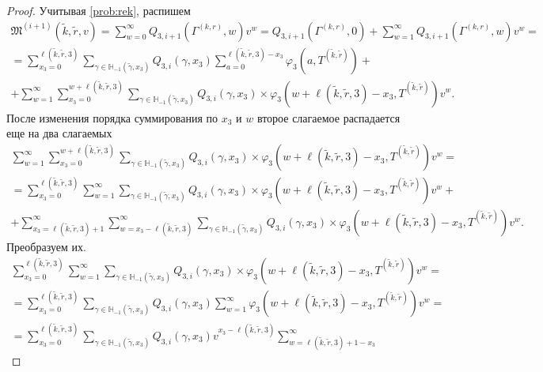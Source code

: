 \documentclass[a4paper,12pt,russian]{extarticle}
\begin{document}
\begin{proof}
Учитывая \eqref{prob:rek}, распишем
\begin{multline}
\mathfrak{M}^{(i+1)}(\tilde{k},\tilde{r},v) =\sum_{w=0}^{\infty} Q_{3,i+1}(\Gamma^{(k,r)},w) v^w = Q_{3,i+1}(\Gamma^{(k,r)},0) + \sum_{w=1}^{\infty} Q_{3,i+1}(\Gamma^{(k,r)},w) v^w =\\
=\sum_{x_3=0}^{\ell(\tilde{k},\tilde{r},3)}\sum_{\gamma \in {\mathbb H}_{-1}(\tilde{\gamma},x_3)} Q_{3,i}(\gamma,x_3) \sum_{a=0}^{\ell(\tilde{k},\tilde{r},3) - x_3} \varphi_3(a,T^{(\tilde{k},\tilde{r})}) + \\
+ \sum_{w=1}^{\infty} \sum_{x_3=0}^{w +  \ell(\tilde{k},\tilde{r},3)}\sum_{\gamma \in {\mathbb H}_{-1}(\tilde{\gamma},x_3)} Q_{3,i}(\gamma,x_3) \times 
\varphi_3(w + \ell(\tilde{k},\tilde{r},3) - x_3,T^{(\tilde{k},\tilde{r})}) v^w.
\label{sum:zero}
\end{multline}
После изменения порядка суммирования по $x_3$ и $w$ второе слагаемое распадается еще на два слагаемых
\begin{multline}
\sum_{w=1}^{\infty} \sum_{x_3=0}^{w +  \ell(\tilde{k},\tilde{r},3)}\sum_{\gamma \in {\mathbb H}_{-1}(\tilde{\gamma},x_3)} Q_{3,i}(\gamma,x_3) \times 
\varphi_3(w + \ell(\tilde{k},\tilde{r},3) - x_3,T^{(\tilde{k},\tilde{r})}) v^w = \\
= \sum_{x_3=0}^{\ell(\tilde{k},\tilde{r},3)}\sum_{w=1}^{\infty}\sum_{\gamma \in {\mathbb H}_{-1}(\tilde{\gamma},x_3)} Q_{3,i}(\gamma,x_3) \times 
\varphi_3(w + \ell(\tilde{k},\tilde{r},3) - x_3,T^{(\tilde{k},\tilde{r})}) v^w + \\
+\sum_{x_3=\ell(\tilde{k},\tilde{r},3) + 1}^{\infty}\sum_{w=x_3-\ell(\tilde{k},\tilde{r},3)}^{\infty}\sum_{\gamma \in {\mathbb H}_{-1}(\tilde{\gamma},x_3)} Q_{3,i}(\gamma,x_3) \times 
\varphi_3(w + \ell(\tilde{k},\tilde{r},3) - x_3,T^{(\tilde{k},\tilde{r})}) v^w.
\label{double:sum}
\end{multline}
Преобразуем их.
\begin{multline}
 \sum_{x_3=0}^{\ell(\tilde{k},\tilde{r},3)}\sum_{w=1}^{\infty}  \sum_{\gamma \in {\mathbb H}_{-1}(\tilde{\gamma},x_3)} Q_{3,i}(\gamma,x_3) \times 
\varphi_3(w + \ell(\tilde{k},\tilde{r},3) - x_3,T^{(\tilde{k},\tilde{r})}) v^w = \\
=  \sum_{x_3=0}^{\ell(\tilde{k},\tilde{r},3)}  \sum_{\gamma \in {\mathbb H}_{-1}(\tilde{\gamma},x_3)} Q_{3,i}(\gamma,x_3)  \sum_{w=1}^{\infty} 
\varphi_3(w + \ell(\tilde{k},\tilde{r},3) - x_3,T^{(\tilde{k},\tilde{r})}) v^w = \\
=\sum_{x_3=0}^{\ell(\tilde{k},\tilde{r},3)}  \sum_{\gamma \in {\mathbb H}_{-1}(\tilde{\gamma},x_3)} Q_{3,i}(\gamma,x_3) v^{x_3-\ell(\tilde{k},\tilde{r},3)}  \sum_{w=\ell(\tilde{k},\tilde{r},3) + 1 -x_3}^{\infty}

\end{multline}
\end{proof}
\end{document}
